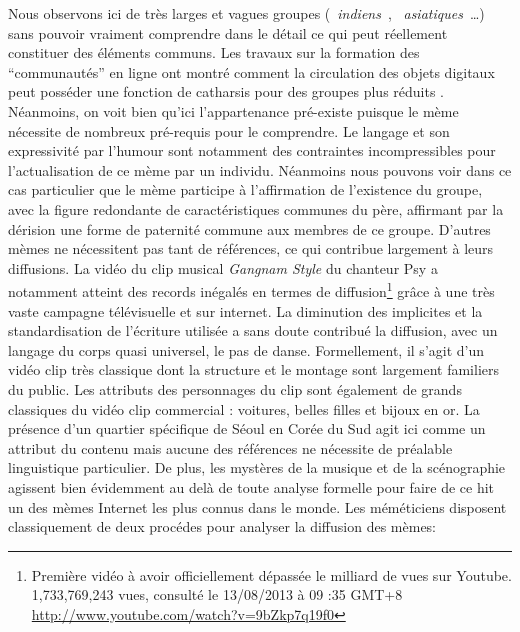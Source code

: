 Nous observons ici de très larges et vagues groupes ({\guillemotleft}~\textit{indiens}~{\guillemotright}, {\guillemotleft}~\textit{asiatiques}~{\guillemotright}{\dots}) sans pouvoir vraiment comprendre dans le détail ce qui peut réellement constituer des éléments communs. Les travaux sur la formation des {\textquotedblleft}communautés{\textquotedblright} en ligne ont montré comment la circulation des objets digitaux peut posséder une fonction de catharsis pour des groupes plus réduits \citep{Steyer2006}. Néanmoins, on voit bien qu{\textquoteright}ici l{\textquoteright}appartenance pré-existe puisque le mème nécessite de nombreux pré-requis pour le comprendre. Le langage et son expressivité par l{\textquoteright}humour sont notamment des contraintes incompressibles pour l{\textquoteright}actualisation de ce mème par un individu. Néanmoins nous pouvons voir dans ce cas particulier que le mème participe à l{\textquoteright}affirmation de l{\textquoteright}existence du groupe, avec la figure redondante de caractéristiques communes du père, affirmant par la dérision une forme de paternité commune aux membres de ce groupe. D{\textquoteright}autres mèmes ne nécessitent pas tant de références, ce qui contribue largement à leurs diffusions. La vidéo du clip musical \textit{Gangnam Style} du chanteur Psy a notamment atteint des records inégalés en termes de diffusion\footnote{ Première vidéo à avoir officiellement dépassée le milliard de vues sur Youtube. 1,733,769,243 vues, consulté le 13/08/2013 à 09 :35 GMT+8 \url{http://www.youtube.com/watch?v=9bZkp7q19f0}} gr\^ace à une très vaste campagne télévisuelle et sur internet. La diminution des implicites et la standardisation de l{\textquoteright}écriture utilisée a sans doute contribué la diffusion, avec un langage du corps quasi universel, le pas de danse. Formellement, il s{\textquoteright}agit d{\textquoteright}un vidéo clip très classique dont la structure et le montage sont largement familiers du public. Les attributs des personnages du clip sont également de grands classiques du vidéo clip commercial : voitures, belles filles et bijoux en or. La présence d{\textquoteright}un quartier spécifique de Séoul en Corée du Sud agit ici comme un attribut du contenu mais aucune des références ne nécessite de préalable linguistique particulier. De plus, les mystères de la musique et de la scénographie agissent bien évidemment au delà de toute analyse formelle pour faire de ce hit un des mèmes Internet les plus connus dans le monde. 
Les méméticiens disposent classiquement de deux procédes pour
analyser la diffusion des mèmes: 

